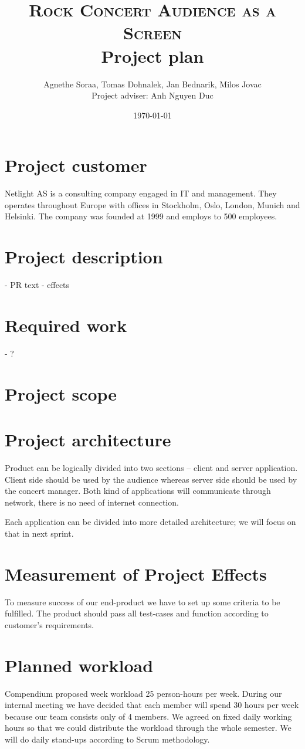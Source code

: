 \documentclass{article}
\title{
    \normalsize \textsc{Rock Concert Audience as a Screen}\\
    \Huge Project plan}
\author{Agnethe Soraa,
Tomas Dohnalek,
Jan Bednarik,
Milos Jovac \\
\normalsize Project adviser: Anh Nguyen Duc}
\date{\today}
\begin{document}
\maketitle
\section{Project customer}
Netlight AS is a consulting company engaged in IT and management. They operates throughout Europe with offices in Stockholm, Oslo, London, Munich and Helsinki. The company was founded at 1999 and employs to 500 employees.

\section{Project description}
- PR text
- effects

\section{Required work}
- ?


\section{Project scope}


\section{Project architecture}
Product can be logically divided into two sections -- client and server application.
Client side should be used by the audience whereas server side should be used by the concert manager.
Both kind of applications will communicate through network, there is no need of internet connection.

Each application can be divided into more detailed architecture; we will focus on that in next sprint.


\section{Measurement of Project Effects}
To measure success of our end-product we have to set up some criteria to be fulfilled. The product should pass all test-cases and function according to customer's requirements.

\section{Planned workload}
Compendium proposed week workload 25 person-hours per week. During our internal meeting we have decided that each member will spend 30 hours per week because our team consists only of 4 members. We agreed on fixed daily working hours so that we could distribute the workload through the whole semester. We will do daily stand-ups according to Scrum methodology.
\end{document}
